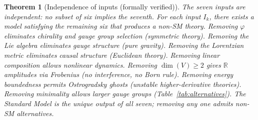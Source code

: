 \documentclass[12pt,a4paper]{article}
\newtheorem{theorem}{Theorem}
\begin{document}
\begin{theorem}[Independence of inputs (formally verified)]
\label{thm:independence}
The seven inputs are independent: no subset of six implies the seventh.  For each input $I_k$, there exists a model satisfying the remaining six that produces a non-SM theory.  Removing $\varphi$ eliminates chirality and gauge group selection (symmetric theory).  Removing the Lie algebra eliminates gauge structure (pure gravity).  Removing the Lorentzian metric eliminates causal structure (Euclidean theory).  Removing linear composition allows nonlinear dynamics.  Removing $\dim(V) \geq 2$ gives $\mathbb{R}$ amplitudes via Frobenius (no interference, no Born rule).  Removing energy boundedness permits Ostrogradsky ghosts (unstable higher-derivative theories).  Removing minimality allows larger gauge groups (Table~\ref{tab:alternatives}).  The Standard Model is the unique output of all seven; removing any one admits non-SM alternatives.
\end{theorem}
\end{document}

